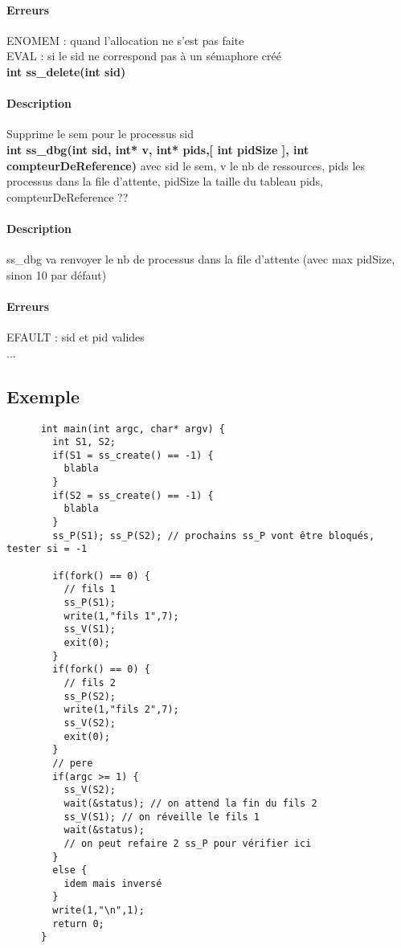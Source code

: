 \documentclass[12pt]{article}
\begin{document}
      \paragraph{Erreurs\\}
      ENOMEM : quand l'allocation ne s'est pas faite \\
      EVAL : si le sid ne correspond pas à un sémaphore créé \\

      \newpage
      \textbf{int ss_delete(int sid)} \\
      \paragraph{Description\\}
      Supprime le sem pour le processus sid \\

      \newpage
      \textbf{int ss_dbg(int sid, int* v, int* pids,[ int pidSize ], int compteurDeReference)} avec sid le sem, v le nb de ressources, pids les processus dans la file d'attente, pidSize la taille du tableau pids, compteurDeReference ??
      \paragraph{Description\\}
      ss_dbg va renvoyer le nb de processus dans la file d'attente (avec max pidSize, sinon 10 par défaut)
      \paragraph{Erreurs\\}
      EFAULT : sid et pid valides \\
      ... \\

      \newpage
      \subsection{Exemple}
      \begin{lstlisting}
      int main(int argc, char* argv) {
        int S1, S2;
        if(S1 = ss_create() == -1) {
          blabla
        }
        if(S2 = ss_create() == -1) {
          blabla
        }
        ss_P(S1); ss_P(S2); // prochains ss_P vont être bloqués, tester si = -1

        if(fork() == 0) {
          // fils 1
          ss_P(S1);
          write(1,"fils 1",7);
          ss_V(S1);
          exit(0);
        }
        if(fork() == 0) {
          // fils 2
          ss_P(S2);
          write(1,"fils 2",7);
          ss_V(S2);
          exit(0);
        }
        // pere
        if(argc >= 1) {
          ss_V(S2);
          wait(&status); // on attend la fin du fils 2
          ss_V(S1); // on réveille le fils 1
          wait(&status);
          // on peut refaire 2 ss_P pour vérifier ici
        }
        else {
          idem mais inversé
        }
        write(1,"\n",1);
        return 0;
      }
      \end{lstlisting}
\end{document}
